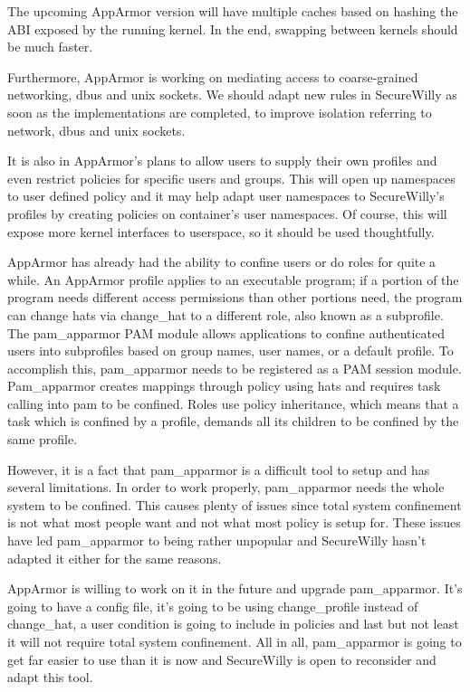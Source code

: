The upcoming AppArmor version will have multiple caches based on hashing the ABI exposed by the running kernel. In the end, swapping between kernels should be much faster.

Furthermore, AppArmor is working on mediating access to coarse-grained networking, dbus and unix sockets. We should adapt new rules in SecureWilly as soon as the implementations are completed, to improve isolation referring to network, dbus and unix sockets. 

It is also in AppArmor's plans to allow users to supply their own profiles and even restrict policies for specific users and groups. This will open up namespaces to user defined policy and it may help adapt user namespaces to SecureWilly's profiles by creating policies on container's user namespaces. Of course, this will expose more kernel interfaces to userspace, so it should be used thoughtfully.

AppArmor has already had the ability to confine users or do roles for quite a while. 
An AppArmor profile applies to an executable program; if a portion of the program needs different access permissions than other portions need, the program can change hats via change\_hat to a different role, also known as a subprofile. The pam\_apparmor PAM module allows applications to confine authenticated users into subprofiles based on group names, user names, or a default profile. To accomplish this, pam\_apparmor needs to be registered as a PAM session module. \cite{susepam}
Pam\_apparmor creates mappings through policy using hats and requires task calling into pam to be confined. Roles use policy inheritance, which means that a task which is confined by a profile, demands all its children to be confined by the same profile.

However, it is a fact that pam\_apparmor is a difficult tool to setup and has several limitations. In order to work properly, pam\_apparmor needs the whole system to be confined. This causes plenty of issues since total system confinement is not what most people want and not what most policy is setup for. These issues have led pam\_apparmor to being rather unpopular and SecureWilly hasn't adapted it either for the same reasons.

AppArmor is willing to work on it in the future and upgrade pam\_apparmor. It's going to have a config file, it's going to be using change\_profile instead of change\_hat, a user condition is going to include in policies and last but not least it will not require total system confinement. All in all, pam\_apparmor is going to get far easier to use than it is now and SecureWilly is open to reconsider and adapt this tool.

